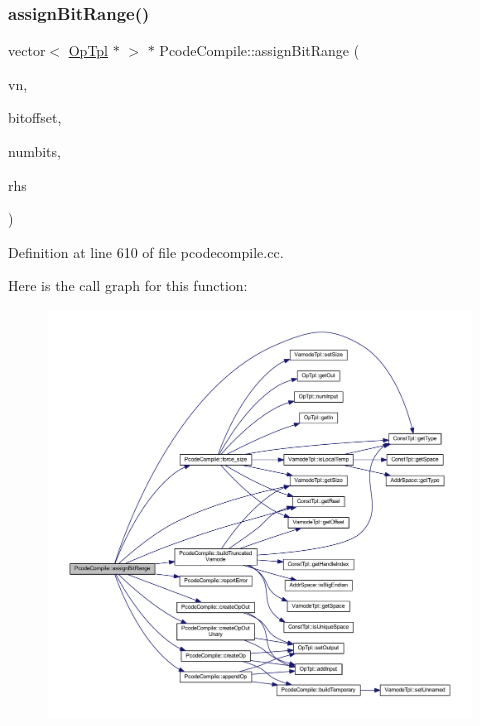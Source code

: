 \subsubsection{\texorpdfstring{assignBitRange()}{assignBitRange()}}
{\footnotesize\ttfamily vector$<$ \mbox{\hyperlink{class_op_tpl}{Op\+Tpl}} $\ast$ $>$ $\ast$ Pcode\+Compile\+::assign\+Bit\+Range (\begin{DoxyParamCaption}\item[{\mbox{\hyperlink{class_varnode_tpl}{Varnode\+Tpl}} $\ast$}]{vn,  }\item[{uint4}]{bitoffset,  }\item[{uint4}]{numbits,  }\item[{\mbox{\hyperlink{class_expr_tree}{Expr\+Tree}} $\ast$}]{rhs }\end{DoxyParamCaption})}



Definition at line 610 of file pcodecompile.\+cc.

Here is the call graph for this function\+:
\nopagebreak
\begin{figure}[H]
\begin{center}
\leavevmode
\includegraphics[width=350pt]{class_pcode_compile_a2ba1215fdd8b357164b6271282f1f808_cgraph}
\end{center}
\end{figure}
\mbox{\label{class_pcode_compile_a376e7dc6da993a0a5ebc0ea372add1af}} 
